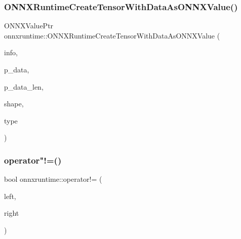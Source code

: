 \mbox{\label{namespaceonnxruntime_a9ef7df1ce928bb454ae46bd4a0cad005}} 
\subsubsection{\texorpdfstring{O\+N\+N\+X\+Runtime\+Create\+Tensor\+With\+Data\+As\+O\+N\+N\+X\+Value()}{ONNXRuntimeCreateTensorWithDataAsONNXValue()}}
{\footnotesize\ttfamily O\+N\+N\+X\+Value\+Ptr onnxruntime\+::\+O\+N\+N\+X\+Runtime\+Create\+Tensor\+With\+Data\+As\+O\+N\+N\+X\+Value (\begin{DoxyParamCaption}\item[{\mbox{\hyperlink{visibility__macros_8h_aa74f89aa7d942f4a79ea12d7c9b763ef}{\+\_\+\+In\+\_\+}} const \mbox{\hyperlink{structONNXRuntimeAllocatorInfo}{O\+N\+N\+X\+Runtime\+Allocator\+Info}} $\ast$}]{info,  }\item[{\mbox{\hyperlink{visibility__macros_8h_aa74f89aa7d942f4a79ea12d7c9b763ef}{\+\_\+\+In\+\_\+}} \mbox{\hyperlink{mlasi_8h_a88f941d423cb2a819b70a1358982b1a6}{void}} $\ast$}]{p\+\_\+data,  }\item[{\mbox{\hyperlink{mlasi_8h_a503efbc1c6e50825320ad909366b78ab}{size\+\_\+t}}}]{p\+\_\+data\+\_\+len,  }\item[{const std\+::vector$<$ \mbox{\hyperlink{mlasi_8h_a503efbc1c6e50825320ad909366b78ab}{size\+\_\+t}} $>$ \&}]{shape,  }\item[{\mbox{\hyperlink{tensor__type__and__shape__c__api_8h_acc48f6a9c9e4d7071352e45ce13324b3}{Onnx\+Runtime\+Tensor\+Element\+Data\+Type}}}]{type }\end{DoxyParamCaption})\hspace{0.3cm}{\ttfamily [inline]}}

\mbox{\label{namespaceonnxruntime_a8dda757b485429e9c2674c863c5cd47a}} 
\subsubsection{\texorpdfstring{operator"!=()}{operator!=()}}
{\footnotesize\ttfamily bool onnxruntime\+::operator!= (\begin{DoxyParamCaption}\item[{const \mbox{\hyperlink{uniononnxruntime_1_1MLFloat16}{M\+L\+Float16}} \&}]{left,  }\item[{const \mbox{\hyperlink{uniononnxruntime_1_1MLFloat16}{M\+L\+Float16}} \&}]{right }\end{DoxyParamCaption})\hspace{0.3cm}{\ttfamily [inline]}}

